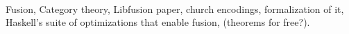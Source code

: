 
~

Fusion, Category theory, Libfusion paper, church encodings, formalization of it, Haskell's suite of optimizations that enable fusion, (theorems for free?).


